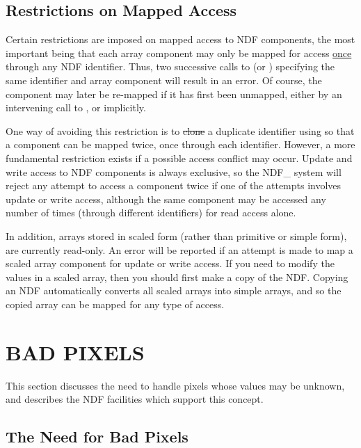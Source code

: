 \subsection{\label{ss:restrictionsonmapping}Restrictions on Mapped Access}

Certain restrictions are imposed on mapped access to NDF components, the
most important being that each array component may only be mapped for access
\underline{once} through any NDF identifier. 
Thus, two successive calls to  (or ) specifying the same
identifier and array component will result in an error. 
Of course, the component may later be re-mapped if it has first been
unmapped, either by an intervening call to , or implicitly.

One way of avoiding this restriction is to \st{clone\/} a duplicate identifier
using  so that a component can be mapped twice, once through each
identifier. 
However, a more fundamental restriction exists if a possible access conflict may
occur.
Update and write access to NDF components is always exclusive, so the NDF\_
system will reject any attempt to access a component twice if one of the
attempts involves update or write access, although the same component may be
accessed any number of times (through different identifiers) for read access
alone.

In addition, arrays stored in scaled form (rather than primitive
or simple form), are currently read-only. An error will be reported if an
attempt is made to map a scaled array component for update or write access.
If you need to modify the values in a scaled array, then you should first
make a copy of the NDF. Copying an NDF automatically converts all scaled
arrays into simple arrays, and so the copied array can be mapped for any 
type of access.

\section{\label{ss:badpixels}BAD PIXELS}

This section discusses the need to handle pixels whose values may be
unknown, and describes the NDF facilities which support this concept. 

\subsection{The Need for Bad Pixels}

